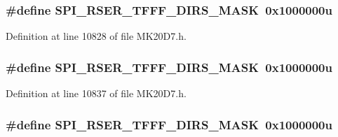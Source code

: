 \subsubsection[{\texorpdfstring{S\+P\+I\+\_\+\+R\+S\+E\+R\+\_\+\+T\+F\+F\+F\+\_\+\+D\+I\+R\+S\+\_\+\+M\+A\+SK}{SPI_RSER_TFFF_DIRS_MASK}}]{\setlength{\rightskip}{0pt plus 5cm}\#define S\+P\+I\+\_\+\+R\+S\+E\+R\+\_\+\+T\+F\+F\+F\+\_\+\+D\+I\+R\+S\+\_\+\+M\+A\+SK~0x1000000u}\hypertarget{group___s_p_i___register___masks_ga01228112dcc4440aa1678eb55b97306e}{}\label{group___s_p_i___register___masks_ga01228112dcc4440aa1678eb55b97306e}


Definition at line 10828 of file M\+K20\+D7.\+h.

\subsubsection[{\texorpdfstring{S\+P\+I\+\_\+\+R\+S\+E\+R\+\_\+\+T\+F\+F\+F\+\_\+\+D\+I\+R\+S\+\_\+\+M\+A\+SK}{SPI_RSER_TFFF_DIRS_MASK}}]{\setlength{\rightskip}{0pt plus 5cm}\#define S\+P\+I\+\_\+\+R\+S\+E\+R\+\_\+\+T\+F\+F\+F\+\_\+\+D\+I\+R\+S\+\_\+\+M\+A\+SK~0x1000000u}\hypertarget{group___s_p_i___register___masks_ga01228112dcc4440aa1678eb55b97306e}{}\label{group___s_p_i___register___masks_ga01228112dcc4440aa1678eb55b97306e}


Definition at line 10837 of file M\+K20\+D7.\+h.

\subsubsection[{\texorpdfstring{S\+P\+I\+\_\+\+R\+S\+E\+R\+\_\+\+T\+F\+F\+F\+\_\+\+D\+I\+R\+S\+\_\+\+M\+A\+SK}{SPI_RSER_TFFF_DIRS_MASK}}]{\setlength{\rightskip}{0pt plus 5cm}\#define S\+P\+I\+\_\+\+R\+S\+E\+R\+\_\+\+T\+F\+F\+F\+\_\+\+D\+I\+R\+S\+\_\+\+M\+A\+SK~0x1000000u}\hypertarget{group___s_p_i___register___masks_ga01228112dcc4440aa1678eb55b97306e}{}\label{group___s_p_i___register___masks_ga01228112dcc4440aa1678eb55b97306e}


